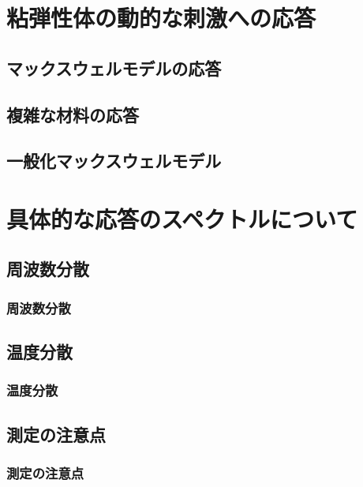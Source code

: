 \documentclass[12pt, dvipdfmx]{beamer}
\newcommand{\backupbegin}{
   \newcounter{framenumberappendix}
   \setcounter{framenumberappendix}{\value{framenumber}}
}
\begin{document}
\section{粘弾性体の動的な刺激への応答}

\subsection{マックスウェルモデルの応答}

\subsection{複雑な材料の応答}

\subsection{一般化マックスウェルモデル}

\section{具体的な応答のスペクトルについて}

\subsection{周波数分散}
\begin{frame}
    \frametitle{周波数分散}
  
\end{frame}

\subsection{温度分散}
\begin{frame}
    \frametitle{温度分散}

\end{frame}

\subsection{測定の注意点}
\begin{frame}
    \frametitle{測定の注意点}

\end{frame}

\end{document}
